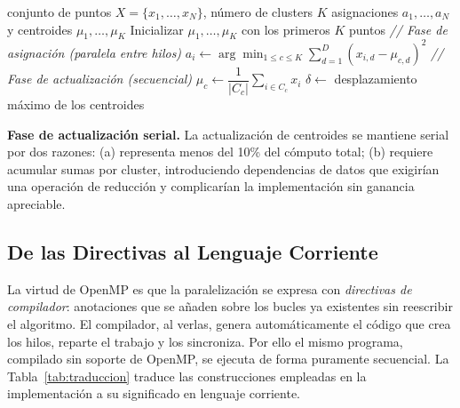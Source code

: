 \documentclass[conference]{IEEEtran}
\begin{document}
\begin{algorithm}[H]
\caption{K-Means con fase de asignaci\'on paralela}
\label{alg:kmeans}
\begin{algorithmic}[1]
\REQUIRE conjunto de puntos $X=\{x_1,\ldots,x_N\}$, n\'umero de clusters $K$
\ENSURE asignaciones $a_1,\ldots,a_N$ y centroides $\mu_1,\ldots,\mu_K$
\STATE Inicializar $\mu_1,\ldots,\mu_K$ con los primeros $K$ puntos
\REPEAT
  \STATE \textit{// Fase de asignaci\'on (paralela entre hilos)}
    \STATE $a_i \gets \displaystyle\arg\min_{1 \le c \le K}
            \sum_{d=1}^{D}(x_{i,d}-\mu_{c,d})^2$
  \ENDFOR
  \STATE \textit{// Fase de actualizaci\'on (secuencial)}
    \STATE $\mu_c \gets \dfrac{1}{|C_c|}\displaystyle\sum_{i \in C_c} x_i$
  \ENDFOR
  \STATE $\delta \gets$ desplazamiento m\'aximo de los centroides
\end{algorithmic}
\end{algorithm}

\textbf{Fase de actualizaci\'on serial.}
La actualizaci\'on de centroides se mantiene serial por dos razones:
(a) representa menos del 10\% del c\'omputo total;
(b) requiere acumular sumas por cluster, introduciendo dependencias de datos
que exigir\'ian una operaci\'on de reducci\'on y complicar\'ian la
implementaci\'on sin ganancia apreciable.

\subsection{De las Directivas al Lenguaje Corriente}

La virtud de OpenMP es que la paralelizaci\'on se expresa con \emph{directivas
de compilador}: anotaciones que se a\~naden sobre los bucles ya existentes sin
reescribir el algoritmo. El compilador, al verlas, genera autom\'aticamente el
c\'odigo que crea los hilos, reparte el trabajo y los sincroniza. Por ello el
mismo programa, compilado sin soporte de OpenMP, se ejecuta de forma puramente
secuencial. La Tabla~\ref{tab:traduccion} traduce las construcciones empleadas
en la implementaci\'on a su significado en lenguaje corriente.
\end{document}
